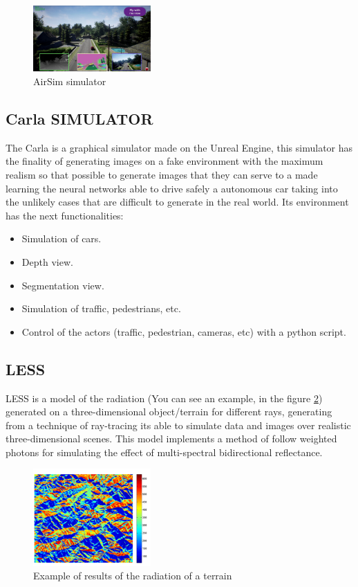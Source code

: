 \documentclass[10pt,a4paper,twocolumn,twoside]{article}
\begin{document}
\begin{figure}[!h]
\centering
  	\includegraphics[width=0.4\textwidth]{airsim}
	\caption{AirSim simulator}
	\label{fig-airsim}
\end{figure}

\subsection{Carla SIMULATOR}
The Carla is a graphical simulator made on the Unreal Engine, this simulator has the finality of generating images on a fake environment with the maximum realism so that possible to generate images that they can serve to a made learning the neural networks able to drive safely a autonomous car taking into the unlikely cases that are difficult to generate in the real world. Its environment has the next functionalities:

\begin{itemize}
  \item Simulation of cars.
  \item Depth view.
  \item Segmentation view.
  \item Simulation of traffic, pedestrians, etc.
  \item Control of the actors (traffic, pedestrian, cameras, etc) with a python script.
\end{itemize}

\subsection{LESS}
LESS is a model of the radiation (You can see an example, in the figure \ref{fig-lessradiacio}) generated on a three-dimensional object/terrain for different rays, generating from a technique of ray-tracing its able to simulate data and images over realistic three-dimensional scenes. This model implements a method of follow weighted photons for simulating the effect of multi-spectral bidirectional reflectance.

\begin{figure}[!h]
\centering
  	\includegraphics[width=0.4\textwidth]{lessradiacio}
	\caption{Example of results of the radiation of a terrain}
	\label{fig-lessradiacio}
\end{figure}
\end{document}
